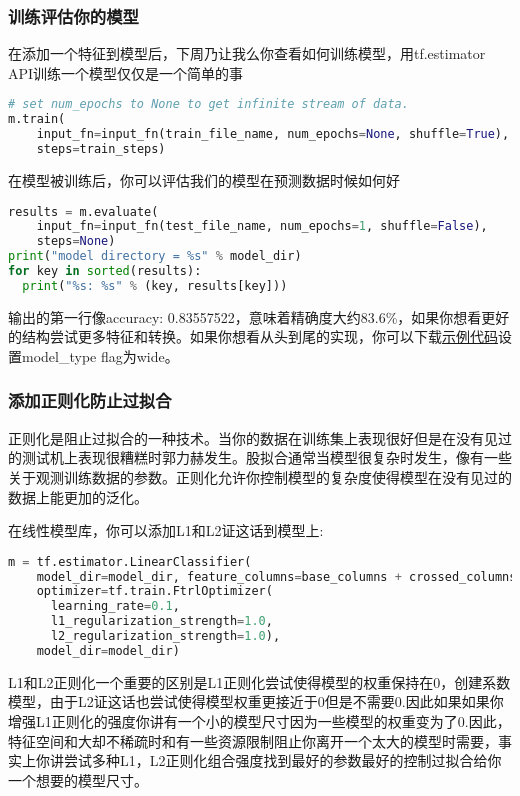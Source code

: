 \subsubsection{训练评估你的模型}
在添加一个特征到模型后，下周乃让我么你查看如何训练模型，用tf.estimator API训练一个模型仅仅是一个简单的事
\begin{lstlisting}[language=Python]
# set num_epochs to None to get infinite stream of data.
m.train(
    input_fn=input_fn(train_file_name, num_epochs=None, shuffle=True),
    steps=train_steps)
\end{lstlisting}
在模型被训练后，你可以评估我们的模型在预测数据时候如何好
\begin{lstlisting}[language=Python]
results = m.evaluate(
    input_fn=input_fn(test_file_name, num_epochs=1, shuffle=False),
    steps=None)
print("model directory = %s" % model_dir)
for key in sorted(results):
  print("%s: %s" % (key, results[key]))
\end{lstlisting}
输出的第一行像accuracy: 0.83557522，意味着精确度大约83.6\%，如果你想看更好的结构尝试更多特征和转换。如果你想看从头到尾的实现，你可以下载\href{https://www.github.com/tensorflow/tensorflow/blob/r1.3/tensorflow/examples/learn/wide_n_deep_tutorial.py}{示例代码}设置model\_type flag为wide。
\subsubsection{添加正则化防止过拟合}
正则化是阻止过拟合的一种技术。当你的数据在训练集上表现很好但是在没有见过的测试机上表现很糟糕时郭力赫发生。股拟合通常当模型很复杂时发生，像有一些关于观测训练数据的参数。正则化允许你控制模型的复杂度使得模型在没有见过的数据上能更加的泛化。

在线性模型库，你可以添加L1和L2证这话到模型上:
\begin{lstlisting}[language=Python]
m = tf.estimator.LinearClassifier(
    model_dir=model_dir, feature_columns=base_columns + crossed_columns,
    optimizer=tf.train.FtrlOptimizer(
      learning_rate=0.1,
      l1_regularization_strength=1.0,
      l2_regularization_strength=1.0),
    model_dir=model_dir)
\end{lstlisting}
L1和L2正则化一个重要的区别是L1正则化尝试使得模型的权重保持在0，创建系数模型，由于L2证这话也尝试使得模型权重更接近于0但是不需要0.因此如果如果你增强L1正则化的强度你讲有一个小的模型尺寸因为一些模型的权重变为了0.因此，特征空间和大却不稀疏时和有一些资源限制阻止你离开一个太大的模型时需要，事实上你讲尝试多种L1，L2正则化组合强度找到最好的参数最好的控制过拟合给你一个想要的模型尺寸。
